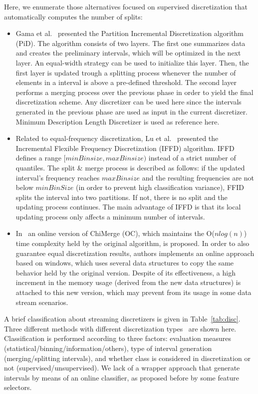 \documentclass[preprint,12pt]{elsarticle}
\begin{document}
Here, we enumerate those alternatives focused on supervised discretization that automatically computes the number of splits:

\begin{itemize}
	\item Gama et al.~\cite{gama06} presented the Partition Incremental Discretization algorithm (PiD). The algorithm consists of two layers. The first one summarizes data and creates the preliminary intervals, which will be optimized in the next layer. An equal-width strategy can be used to initialize this layer. Then, the first layer is updated trough a splitting process whenever the number of elements in a interval is above a pre-defined threshold. The second layer performs a merging process over the previous phase in order to yield the final discretization scheme. Any discretizer can be used here since the intervals generated in the previous phase are used as input in the current discretizer. Minimum Description Length Discretizer is used as reference here.
	\item Related to equal-frequency discretization, Lu et al.~\cite{lu06} presented the Incremental Flexible Frequency Discretization (IFFD) algorithm. IFFD defines a range $[minBinsize, maxBinsize)$ instead of a strict number of quantiles. The split \& merge process is described as follows: if the updated interval's frequency reaches $maxBinsize$ and the resulting frequencies are not below $minBinSize$ (in order to prevent high classification variance), FFID splits the interval into two partitions. If not, there is no split and the updating process continues. The main advantage of IFFD is that its local updating process only affects a minimum number of intervals.
	\item In~\cite{lehti12} an online version of ChiMerge (OC), which maintains the O($nlog(n)$) time complexity held by the original algorithm, is proposed. In order to also guarantee equal discretization results, authors implements an online approach based on windows, which uses several data structures to copy the same behavior held by the original version. Despite of its effectiveness, a high increment in the memory usage (derived from the new data structures) is attached to this new version, which may prevent from its usage in some data stream scenarios.
\end{itemize}

A brief classification about streaming discretizers is given in Table~\ref{tab:disc}. Three different methods with different discretization types~\cite{garcia14} are shown here. Classification is performed according to three factors: evaluation measures (statistical/binning/information/others), type of interval generation (merging/splitting intervals), and whether class is considered in discretization or not (supervised/unsupervised). We lack of a wrapper approach that generate intervals by means of an online classifier, as proposed before by some feature selectors.
\end{document}
